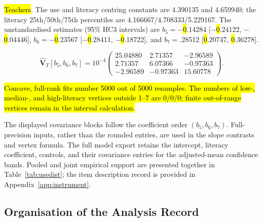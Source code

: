 \documentclass[sustainability,article,accept,moreauthors]{Definitions/mdpi}
\begin{document}
\noindent \hl{Teachers}. The use and literacy centring constants are 4.390135 and 4.659940; the literacy 25th/50th/75th percentiles are 4.166667/4.708333/5.229167. The unstandardised estimates (95\% HC3 intervals) are $b_5=$$-$\hl{0}.14284 [$-$\hl{0}.24122, $-$\hl{0}.04446], $b_6=$$-$\hl{0}.23567 [$-$\hl{0}.28411, $-$\hl{0}.18722], and $b_7=$.28512 [\hl{0}.20747, \hl{0}.36278].

\begin{equation}\label{eq:covT}
\widehat{\mathbf V}_{T}[b_5,b_6,b_7]=10^{-4}\begin{pmatrix}
25.04880 & 2.71357 & -2.96589\\
2.71357 & 6.07366 & -0.97363\\
-2.96589 & -0.97363 & 15.60778
\end{pmatrix}.
\end{equation}

\hl{Concave, full-rank fits number 5000 out of 5000 resamples. The numbers of low-, median-, and high-literacy vertices outside 1--7 are 0/0/0; finite out-of-range vertices remain in the interval calculation.} 


The displayed covariance blocks follow the coefficient order $(b_5,b_6,b_7)$. Full-precision inputs, rather than the rounded entries, are used in the slope contrasts and vertex formula. The full model export retains the intercept, literacy coefficient, controls, and their covariance entries for the adjusted-mean confidence bands. Pooled and joint empirical support are presented together in Table~\ref{tab:usedist}; the item description record is provided in Appendix~\ref{app:instrument}.


\subsection{Organisation of the Analysis Record}
\end{document}
